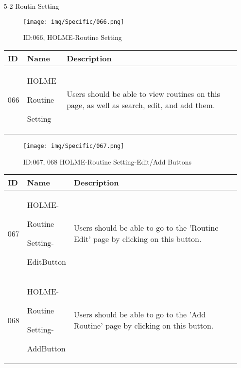 \documentclass[conference]{IEEEtran}
\begin{document}
\begin{enumerate}
\item[5-2] Routin Setting\\
\begin{figure}[h]
\centering
\texttt{[image: img/Specific/066.png]}
\caption{ID:066, HOLME-Routine Setting}
\end{figure}
\begin{table}[h]
\def\arraystretch{1.2} \small
    \begin{tabular}{|p{1cm}|p{1.8cm}|p{5.0cm}|}
        \hline
        ID & Name & Description\\ \hline
         066 \par  & HOLME-\par Routine \par Setting  & 
Users should be able to view routines on this page, as well as search, edit, and add them. \\ \hline
    \end{tabular}
\end{table}

\begin{figure}[h]
\centering
\texttt{[image: img/Specific/067.png]}
\caption{ID:067, 068 HOLME-Routine Setting-Edit/Add Buttons}
\end{figure}
\begin{table}[h]
\def\arraystretch{1.2} \small
    \begin{tabular}{|p{1cm}|p{1.8cm}|p{5.0cm}|}
        \hline
        ID & Name & Description\\ \hline
         067 \par  & HOLME-\par Routine \par Setting- \par EditButton & 
Users should be able to go to the 'Routine Edit' page by clicking on this button.\\ \hline
         068 \par  & HOLME-\par Routine \par Setting- \par AddButton & 

Users should be able to go to the 'Add Routine' page by clicking on this button. \\ \hline    
    \end{tabular}
\end{table}


\end{enumerate}
\end{document}

